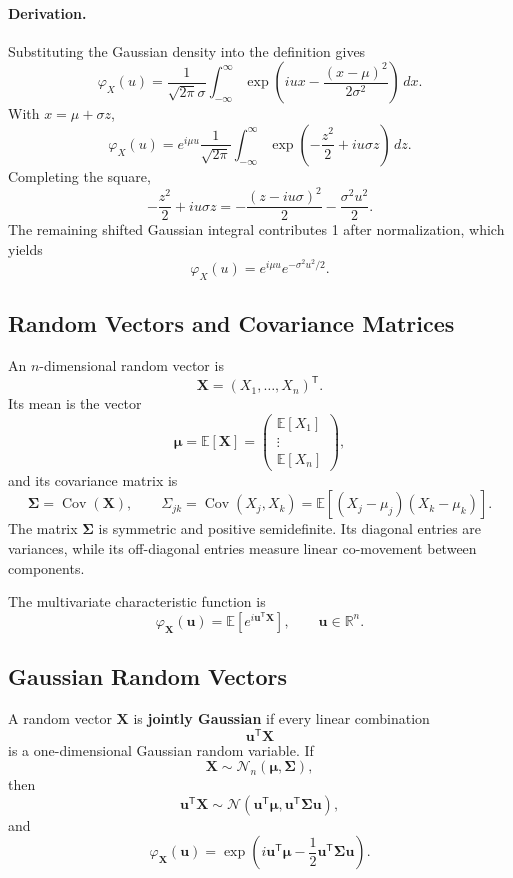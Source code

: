 \documentclass[12pt,openany]{book}
\theoremstyle{definition}
\theoremstyle{remark}
\begin{document}
\paragraph{Derivation.}
Substituting the Gaussian density into the definition gives
\[
\varphi_X(u)
=\frac{1}{\sqrt{2\pi}\sigma}
\int_{-\infty}^{\infty}
\exp\!\left(
iux-\frac{(x-\mu)^2}{2\sigma^2}
\right)\,dx.
\]
With \(x=\mu+\sigma z\),
\[
\varphi_X(u)
=e^{i\mu u}
\frac{1}{\sqrt{2\pi}}
\int_{-\infty}^{\infty}
\exp\!\left(-\frac{z^2}{2}+iu\sigma z\right)\,dz.
\]
Completing the square,
\[
-\frac{z^2}{2}+iu\sigma z
=-\frac{(z-iu\sigma)^2}{2}
-\frac{\sigma^2u^2}{2}.
\]
The remaining shifted Gaussian integral contributes 1 after normalization,
which yields
\[
\varphi_X(u)
=e^{i\mu u}e^{-\sigma^2u^2/2}.
\]

\subsection{Random Vectors and Covariance Matrices}

An \(n\)-dimensional random vector is
\[
\boldsymbol{X}
=(X_1,\ldots,X_n)^{\mathsf{T}}.
\]
Its mean is the vector
\[
\boldsymbol{\mu}
=\mathbb{E}[\boldsymbol{X}]
=\begin{pmatrix}
\mathbb{E}[X_1]\\
\vdots\\
\mathbb{E}[X_n]
\end{pmatrix},
\]
and its covariance matrix is
\[
\boldsymbol{\Sigma}
=\operatorname{Cov}(\boldsymbol{X}),
\qquad
\Sigma_{jk}
=\operatorname{Cov}(X_j,X_k)
=\mathbb{E}\!\left[(X_j-\mu_j)(X_k-\mu_k)\right].
\]
The matrix \(\boldsymbol{\Sigma}\) is symmetric and positive semidefinite.
Its diagonal entries are variances, while its off-diagonal entries measure
linear co-movement between components.

The multivariate characteristic function is
\[
\varphi_{\boldsymbol{X}}(\boldsymbol{u})
=\mathbb{E}\!\left[
e^{i\boldsymbol{u}^{\mathsf{T}}\boldsymbol{X}}
\right],
\qquad \boldsymbol{u}\in\mathbb{R}^n.
\]

\subsection{Gaussian Random Vectors}

A random vector \(\boldsymbol{X}\) is \textbf{jointly Gaussian} if every
linear combination
\[
\boldsymbol{u}^{\mathsf{T}}\boldsymbol{X}
\]
is a one-dimensional Gaussian random variable. If
\[
\boldsymbol{X}\sim\mathcal{N}_n
(\boldsymbol{\mu},\boldsymbol{\Sigma}),
\]
then
\[
\boldsymbol{u}^{\mathsf{T}}\boldsymbol{X}
\sim
\mathcal{N}\!\left(
\boldsymbol{u}^{\mathsf{T}}\boldsymbol{\mu},
\boldsymbol{u}^{\mathsf{T}}\boldsymbol{\Sigma}\boldsymbol{u}
\right),
\]
and
\[
\boxed{
\varphi_{\boldsymbol{X}}(\boldsymbol{u})
=\exp\!\left(
i\boldsymbol{u}^{\mathsf{T}}\boldsymbol{\mu}
-\frac{1}{2}
\boldsymbol{u}^{\mathsf{T}}
\boldsymbol{\Sigma}
\boldsymbol{u}
\right)
}.
\]
\end{document}
